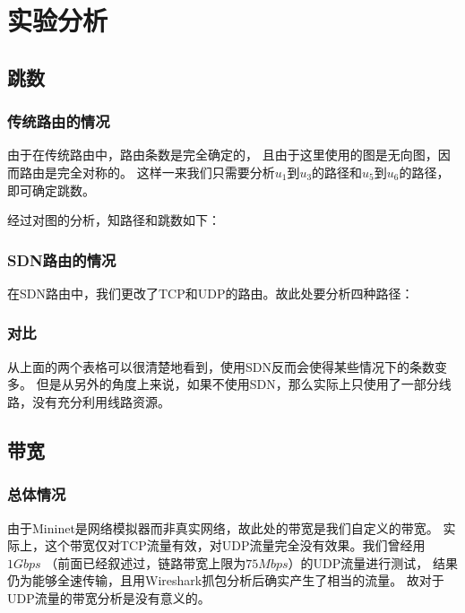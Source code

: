 \chapter{实验分析}
\label{cha:analyze}

\section{跳数}

\subsection{传统路由的情况}

由于在传统路由中，路由条数是完全确定的，
且由于这里使用的图是无向图，因而路由是完全对称的。
这样一来我们只需要分析$u_1$到$u_3$的路径和$u_5$到$u_6$的路径，
即可确定跳数。

经过对图的分析，知路径和跳数如下：



\subsection{SDN路由的情况}

在SDN路由中，我们更改了TCP和UDP的路由。故此处要分析四种路径：



\subsection{对比}

从上面的两个表格可以很清楚地看到，使用SDN反而会使得某些情况下的条数变多。
但是从另外的角度上来说，如果不使用SDN，那么实际上只使用了一部分线路，没有充分利用线路资源。

\section{带宽}

\subsection{总体情况}

由于Mininet是网络模拟器而非真实网络，故此处的带宽是我们自定义的带宽。
实际上，这个带宽仅对TCP流量有效，对UDP流量完全没有效果。我们曾经用$1Gbps$
（前面已经叙述过，链路带宽上限为$75Mbps$）的UDP流量进行测试，
结果仍为能够全速传输，且用Wireshark抓包分析后确实产生了相当的流量。
故对于UDP流量的带宽分析是没有意义的。

